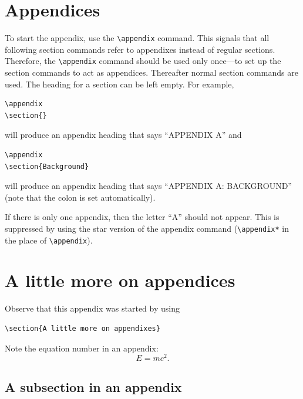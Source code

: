 \documentclass[reprint]{JASA}
\begin{document}
\section{Appendices}
To start the appendix, use the \verb+\appendix+ command.
This signals that all following section commands refer to appendixes
instead of regular sections. Therefore, the \verb+\appendix+ command
should be used only once---to set up the section commands to act as
appendices. Thereafter normal section commands are used. The heading
for a section can be left empty. For example,
\begin{verbatim}
\appendix
\section{}
\end{verbatim}
will produce an appendix heading that says ``APPENDIX A'' and
\begin{verbatim}
\appendix
\section{Background}
\end{verbatim}
will produce an appendix heading that says ``APPENDIX A: BACKGROUND''
(note that the colon is set automatically).

If there is only one appendix, then the letter ``A'' should not
appear. This is suppressed by using the star version of the appendix
command (\verb+\appendix*+ in the place of \verb+\appendix+).
\vskip12pt
\vskip1sp
\section{A little more on appendices}

Observe that this appendix was started by using
\begin{verbatim}
\section{A little more on appendixes}
\end{verbatim}

Note the equation number in an appendix:
\begin{equation}
E=mc^2.
\end{equation}


\subsection{\label{app:subsec}A subsection in an appendix}
\end{document}
